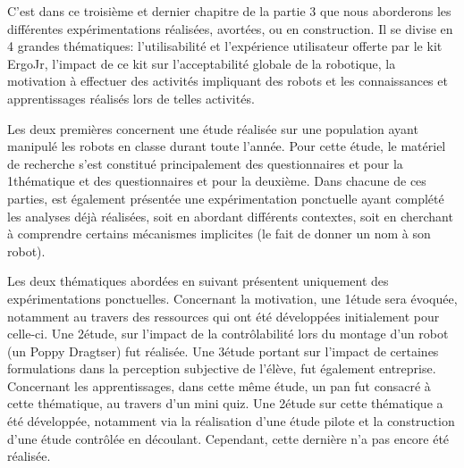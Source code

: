\begin{resumChap}[.92]
C'est dans ce troisième et dernier chapitre de la partie 3 que nous aborderons les différentes expérimentations réalisées, avortées, ou en construction.
Il se divise en 4 grandes thématiques: \Li l'utilisabilité et l'expérience utilisateur offerte par le kit ErgoJr, \ii l'impact de ce kit sur l'acceptabilité globale de la robotique, \iii la motivation à effectuer des activités impliquant des robots et \iiii les connaissances et apprentissages réalisés lors de telles activités.\par%
Les deux premières concernent une étude réalisée sur une population ayant manipulé les robots en classe durant toute l'année.
Pour cette étude, le matériel de recherche s'est constitué principalement des questionnaires  et  pour la 1\iere thématique et des questionnaires  et  pour la deuxième. Dans chacune de ces parties, est également présentée une expérimentation ponctuelle ayant complété les analyses déjà réalisées, soit en abordant différents contextes, soit en cherchant à comprendre certains mécanismes implicites (\ie le fait de donner un nom à son robot).\par%
Les deux thématiques abordées en suivant présentent uniquement des expérimentations ponctuelles. 
Concernant la motivation, une 1\iere étude\break {} sera évoquée, notamment au travers des ressources qui ont été développées initialement pour celle-ci. Une 2\ieme étude, sur l'impact de la contrôlabilité lors du montage d'un robot (un Poppy Dragtser) fut réalisée.
Une 3\ieme étude portant sur l'impact de certaines formulations dans la perception subjective de l'élève, fut également entreprise.
Concernant les apprentissages, dans cette même étude, un pan fut consacré à cette thématique, au travers d'un mini quiz. Une 2\nde étude sur cette thématique a été développée, notamment via la réalisation d'une étude pilote et la construction d'une étude contrôlée en découlant. Cependant, cette dernière n'a pas encore été réalisée.\par%
\end{resumChap}{}
